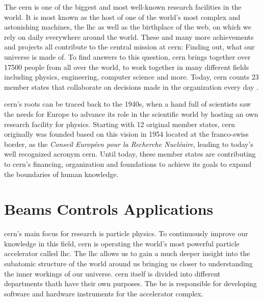 The \gls{cern} is one of the biggest and most well-known research facilities in
the world. It is most known as the host of one of the world's most complex and
astonishing machines, the \gls{lhc} as well as the birthplace of the \gls{web},
on which we rely on daily everywhere around the world. \cite{Cern} These and
many more achievements and projects all contribute to the central mission at
\gls{cern}: Finding out, what our universe is made of. To find answers to this
question, \gls{cern} brings together over 17500 people from all over the world,
to work together in many different fields including physics, engineering,
computer science and more. Today, \gls{cern} counts 23 member states that
collaborate on decisions made in the organization every day
\cite{CernWhoWeAre}.

\gls{cern}'s roots can be traced back to the 1940s, when a hand full of
scientists saw the needs for Europe to advance its role in the scientific world
by hosting an own research facility for physics. Starting with 12 original
member states, \gls{cern} originally was founded based on this vision in 1954
located at the franco-swiss border, as the \emph{Conseil Européen pour la
Recherche Nucléaire}, leading to today's well recognized acronym \gls{cern}.
Until today, these member states are contributing to \gls{cern}'s financing,
organization and foundations to achieve its goals to expand the boundaries of
human knowledge. \cite{CernOurHistory}





\section{Beams Controls Applications}
\label{sec:Introduction:BE-CO-APS}

\gls{cern}'s main focus for research is particle physics. To continuously
improve our knowledge in this field, \gls{cern} is operating the world's most
powerful particle accelerator called \gls{lhc}. The \gls{lhc} allows us to gain
a much deeper insight into the subatomic structure of the world around us
bringing us closer to understanding the inner workings of our universe.
\gls{cern} itself is divided into different departments thath have their own
purposes. The \gls{be} is responsible for developing software and hardware
instruments for the accelerator complex. \cite{CernBeamsDep}

